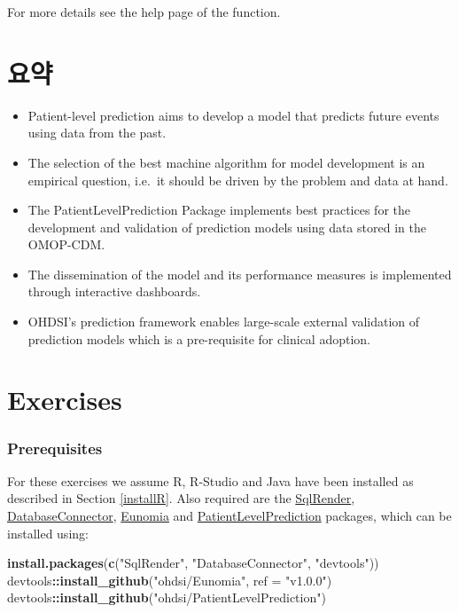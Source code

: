 \documentclass[11pt]{book}
\newenvironment{Shaded}{\begin{snugshade}}{\end{snugshade}}
\newcommand{\KeywordTok}[1]{\textcolor[rgb]{0.13,0.29,0.53}{\textbf{#1}}}
\newcommand{\DataTypeTok}[1]{\textcolor[rgb]{0.13,0.29,0.53}{#1}}
\newcommand{\StringTok}[1]{\textcolor[rgb]{0.31,0.60,0.02}{#1}}
\newcommand{\OperatorTok}[1]{\textcolor[rgb]{0.81,0.36,0.00}{\textbf{#1}}}
\newcommand{\NormalTok}[1]{#1}
\theoremstyle{definition}
\theoremstyle{definition}
\theoremstyle{definition}
\theoremstyle{remark}
\let\BeginKnitrBlock\begin \let\EndKnitrBlock\end
\begin{document}
For more details see the help page of the function.

\section{요약}\label{-11}

\BeginKnitrBlock{rmdsummary}
\begin{itemize}
\item
  Patient-level prediction aims to develop a model that predicts future
  events using data from the past.
\item
  The selection of the best machine algorithm for model development is
  an empirical question, i.e.~it should be driven by the problem and
  data at hand.
\item
  The PatientLevelPrediction Package implements best practices for the
  development and validation of prediction models using data stored in
  the OMOP-CDM.
\item
  The dissemination of the model and its performance measures is
  implemented through interactive dashboards.
\item
  OHDSI's prediction framework enables large-scale external validation
  of prediction models which is a pre-requisite for clinical adoption.
\end{itemize}
\EndKnitrBlock{rmdsummary}

\section{Exercises}\label{exercises-2}

\subsubsection*{Prerequisites}\label{prerequisites-2}

For these exercises we assume R, R-Studio and Java have been installed
as described in Section \ref{installR}. Also required are the
\href{https://ohdsi.github.io/SqlRender/}{SqlRender},
\href{https://ohdsi.github.io/DatabaseConnector/}{DatabaseConnector},
\href{https://ohdsi.github.io/Eunomia/}{Eunomia} and
\href{https://ohdsi.github.io/PatientLevelPrediction/}{PatientLevelPrediction}
packages, which can be installed using:

\begin{Shaded}
\begin{Highlighting}[]
\KeywordTok{install.packages}\NormalTok{(}\KeywordTok{c}\NormalTok{(}\StringTok{"SqlRender"}\NormalTok{, }\StringTok{"DatabaseConnector"}\NormalTok{, }\StringTok{"devtools"}\NormalTok{))}
\NormalTok{devtools}\OperatorTok{::}\KeywordTok{install_github}\NormalTok{(}\StringTok{"ohdsi/Eunomia"}\NormalTok{, }\DataTypeTok{ref =} \StringTok{"v1.0.0"}\NormalTok{)}
\NormalTok{devtools}\OperatorTok{::}\KeywordTok{install_github}\NormalTok{(}\StringTok{"ohdsi/PatientLevelPrediction"}\NormalTok{)}
\end{Highlighting}
\end{Shaded}
\end{document}
